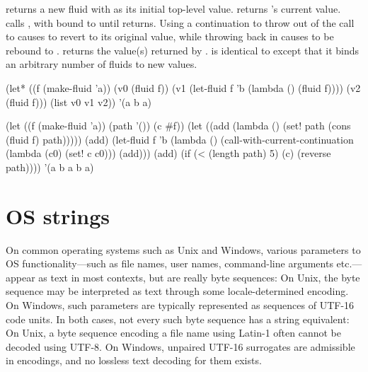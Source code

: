 \begin{protos}
\end{protos}
\noindent
{} returns a new fluid with  as its initial
 top-level value.
 returns 's current value.
 calls , with  bound to 
 until  returns.
Using a continuation to throw out of the call to  causes
  to revert to its original value, while throwing back
 in causes  to be rebound to .
 returns the value(s) returned by .
 is identical to  except that it binds
 an arbitrary number of fluids to new values.

\begin{example}
(let* ((f (make-fluid 'a))
       (v0 (fluid f))
       (v1 (let-fluid f 'b
             (lambda ()
               (fluid f))))
       (v2 (fluid f)))
  (list v0 v1 v2))
  \evalsto '(a b a)
\end{example}

\begin{example}
(let ((f (make-fluid 'a))
      (path '())
      (c \#f))
  (let ((add (lambda ()
               (set! path (cons (fluid f) path)))))
    (add)
    (let-fluid f 'b
      (lambda ()
        (call-with-current-continuation
          (lambda (c0)
            (set! c c0)))
        (add)))
    (add)
    (if (< (length path) 5)
        (c)
        (reverse path))))
  \evalsto '(a b a b a)
\end{example}

\section{OS strings}
\label{os-strings}

On common operating systems such as Unix and Windows, various
parameters to OS functionality---such as file names, user names,
command-line arguments etc.---appear as text in most contexts, but are
really byte sequences: On Unix, the byte sequence may be interpreted
as text through some locale-determined encoding.  On Windows, such
parameters are typically represented as sequences of UTF-16 code
units.  In both cases, not every such byte sequence has a string
equivalent: On Unix, a byte sequence encoding a file name using
Latin-1 often cannot be decoded using UTF-8.  On Windows, unpaired
UTF-16 surrogates are admissible in encodings, and no lossless text
decoding for them exists.

